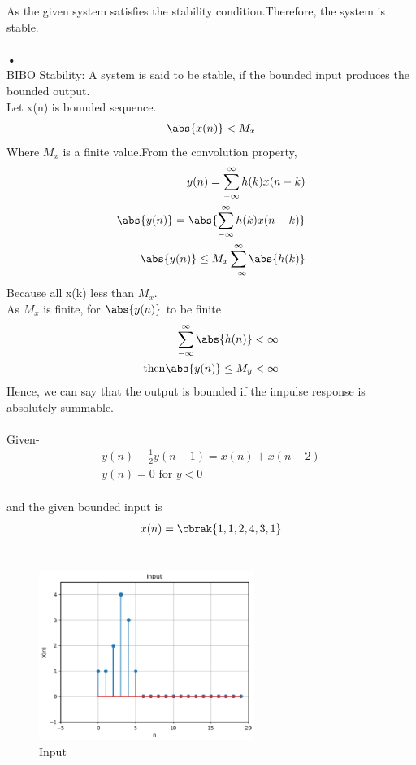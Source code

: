 \documentclass[journal,12pt,twocolumn]{IEEEtran}
\begin{document}
As the given system satisfies the stability condition.Therefore, the system is stable.\\
\\
\textbf{•}
\\
BIBO Stability: A system is said to be stable, if the bounded input produces the bounded output.\\
Let x(n) is bounded sequence.
\begin{align}
\abs{x(n)}<M_x
\end{align}
Where $M_x$ is a finite value.From the convolution property,
\begin{align}
 y(n)= \sum_{-\infty}^{\infty}h(k)x(n-k)\\
 \abs{y(n)}= \abs{\sum_{-\infty}^{\infty}h(k)x(n-k)}\\
 \abs{y(n)} \leq M_x\sum_{-\infty}^{\infty}\abs{h(k)} 
\end{align}
Because all x(k) less than $M_x$.\\
As $M_x$ is finite, for $\abs{y(n)}$ to be finite
\begin{align}
\sum_{-\infty}^{\infty}\abs{h(n)} < 
\infty \\
\text{then} \abs{y(n)} \leq M_y < \infty 
\end{align}
Hence, we can say that the output is bounded if the impulse response is absolutely summable.\\
\\
Given- 
\begin{align}
y(n)+\frac{1}{2}y(n-1) = x(n)+x(n-2) \\
y(n)=0 \text{ for }y<0
\end{align}\\
and the given bounded input is \\
\begin{align}
x(n) = \cbrak{1,1,2,4,3,1}
\end{align} \\
\begin{figure}[h!]
    \centering
    \includegraphics[width=7cm]{./figures/Figure_1.eps}
    \caption{Input}
    \label{xn}
\end{figure}\\
\end{document}
